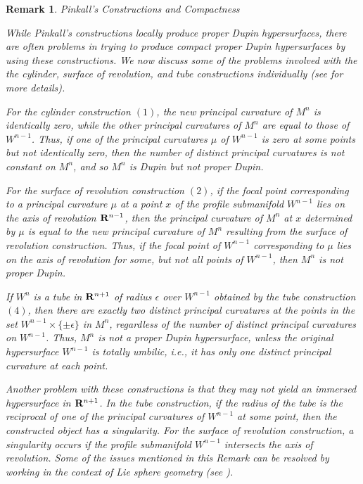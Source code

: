 \documentclass[12pt]{article}
\newtheorem{remark}{Remark}[section]
\begin{document}
{\begin{remark}{Pinkall's Constructions and Compactness}
\label{rem:pinkall-constructions-compactness}

\noindent
{\rm While Pinkall's constructions locally produce proper Dupin hypersurfaces, 
there are often problems in trying to produce compact proper Dupin hypersurfaces by using these
constructions.  We now discuss some of the problems involved
with the the cylinder, 
surface of revolution, and tube constructions individually (see \cite[pp. 127--141]{Cec9} for more details).

For the cylinder construction $(1)$,
the new principal curvature of $M^n$ is identically zero, while 
the other principal curvatures of $M^n$ are equal to those
of $W^{n-1}$.  Thus, if one of the principal curvatures $\mu$
of $W^{n-1}$ is zero at some points but not identically
zero, then the number of distinct principal curvatures 
is not constant on $M^n$, and so $M^n$ is Dupin but not proper Dupin.  

For the surface of revolution construction $(2)$, if the focal point corresponding to a principal curvature
$\mu$ at a point $x$ of the profile submanifold $W^{n-1}$ lies on the axis of revolution ${\bf R}^{n-1}$, then
the principal curvature of $M^n$ at $x$ 
determined by $\mu$ is equal to the new principal curvature of $M^n$ resulting from
the surface of revolution construction.
Thus, if the focal point of $W^{n-1}$ corresponding to $\mu$ lies
on the axis of revolution for some, but not all points of  $W^{n-1}$, then $M^n$ is not proper Dupin.

If $W^n$ is a tube in ${\bf R}^{n+1}$ of radius
$\epsilon$ over $W^{n-1}$ obtained by the tube construction $(4)$, then there are exactly two
distinct principal curvatures at the points in the set
$W^{n-1} \times \{ \pm \epsilon \}$ in $M^n$, regardless
of the number of distinct principal curvatures on $W^{n-1}$.
Thus, $M^n$ is not a proper Dupin hypersurface, unless the original hypersurface $W^{n-1}$ is totally umbilic, i.e., it
has only one distinct principal curvature at each point.

Another problem with these constructions is that they may not yield
an immersed hypersurface in ${\bf R}^{n+1}$. In the tube construction, if the
radius of the tube is the reciprocal of one of the 
principal curvatures of $W^{n-1}$ at some point, then the constructed object has a singularity.  For the
surface of revolution construction, a singularity occurs
if the profile submanifold $W^{n-1}$ intersects the axis of revolution. 
Some of the issues mentioned in this Remark can be resolved by working
in the context of Lie sphere geometry (see \cite[pp. 125--148]{Cec9}).}
\end{remark}




}
\end{document}
